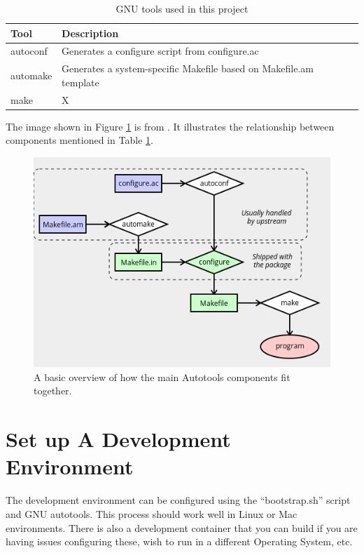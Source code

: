 \begin{table}[ht]
	\centering
	\begin{tabular}{|l|l|}\hline
		Tool & Description \\\hline
		autoconf & Generates a configure script from configure.ac   \\\hline
		automake & Generates a system-specific Makefile based on Makefile.am template    \\\hline
		make  &   X    \\\hline
	\end{tabular}
	\caption{GNU tools used in this project}
	\label{Autotools}
\end{table}
\vspace{2mm}

\justifying
The image shown in Figure \ref{diagram} is from \cite{autobasics}.
It illustrates the relationship between components mentioned in Table \ref{Autotools}.
\vspace{2mm}

\begin{figure}[ht]
	\includegraphics[width=12cm]{images/diagram.png}
	\caption{A basic overview of how the main Autotools components fit together.}
	\label{diagram}
\end{figure}
\vspace{2mm}

\section{\label{sec:dev-env}Set up A Development Environment}

\justifying
The development environment can be configured using the ``bootstrap.sh'' script and GNU autotools. This process should work
well in Linux or Mac environments. There is also a development container that you can build if you are having
issues configuring these, wish to run in a different Operating System, etc.

